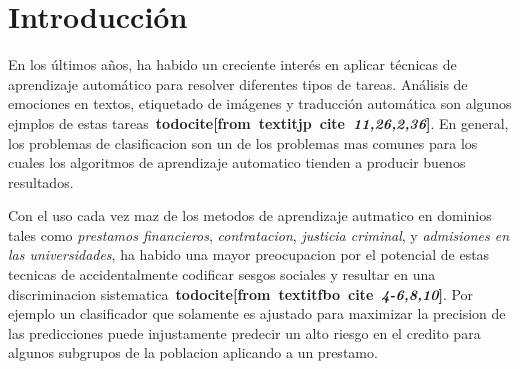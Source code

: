 \chapter*{Introducción}\label{chapter:introduction}

\newcommand{\todocite}[2]{\textbf{todocite[from~textit{#1}~cite~\textit{#2}]}}



En los últimos años, ha habido un creciente interés en aplicar técnicas de aprendizaje automático para resolver diferentes tipos de tareas.
Análisis de emociones en textos, etiquetado de imágenes y traducción automática son algunos ejmplos de estas tareas~\todocite{jp}{11,26,2,36}.
En general, los problemas de clasificacion son un de los problemas mas comunes para los cuales los algoritmos de aprendizaje automatico tienden a producir buenos resultados.


Con el uso cada vez maz de los metodos de aprendizaje autmatico en dominios tales como \emph{prestamos financieros}, \emph{contratacion}, \emph{justicia criminal}, y \emph{admisiones en las universidades}, ha habido una mayor preocupacion por el potencial de estas tecnicas de accidentalmente codificar sesgos sociales y resultar en una discriminacion sistematica~\todocite{fbo}{4-6,8,10}.
Por ejemplo un clasificador que solamente es ajustado para maximizar la precision de las predicciones puede injustamente predecir un alto riesgo en el credito para algunos subgrupos de la poblacion aplicando a un prestamo.






